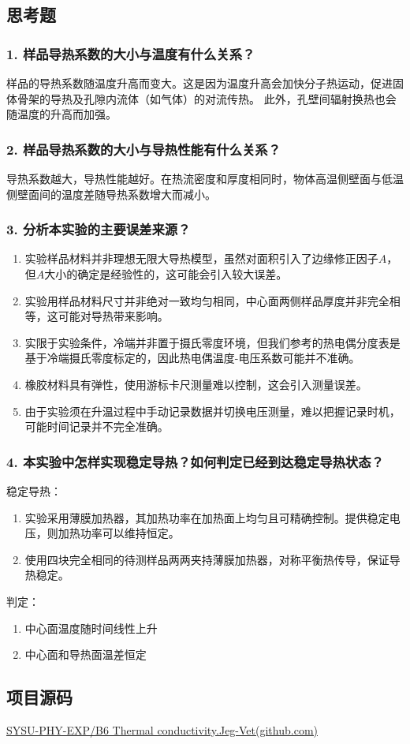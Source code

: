 \documentclass[12pt,a4paper,UTF8]{ctexart}
\begin{document}
\subsection*{思考题}
\subsubsection*{1. 样品导热系数的大小与温度有什么关系？}
样品的导热系数随温度升高而变大。这是因为温度升高会加快分子热运动，促进固体骨架的导热及孔隙内流体（如气体）的对流传热。
此外，孔壁间辐射换热也会随温度的升高而加强。
\subsubsection*{2. 样品导热系数的大小与导热性能有什么关系？}
导热系数越大，导热性能越好。在热流密度和厚度相同时，物体高温侧壁面与低温侧壁面间的温度差随导热系数增大而减小。
\subsubsection*{3. 分析本实验的主要误差来源？}
\begin{enumerate}[label=\arabic*.]
	\item 实验样品材料并非理想无限大导热模型，虽然对面积引入了边缘修正因子$A$，但$A$大小的确定是经验性的，这可能会引入较大误差。
	\item 实验用样品材料尺寸并非绝对一致均匀相同，中心面两侧样品厚度并非完全相等，这可能对导热带来影响。
	\item 实限于实验条件，冷端并非置于摄氏零度环境，但我们参考的热电偶分度表是基于冷端摄氏零度标定的，因此热电偶温度-电压系数可能并不准确。
	\item 橡胶材料具有弹性，使用游标卡尺测量难以控制，这会引入测量误差。
	\item 由于实验须在升温过程中手动记录数据并切换电压测量，难以把握记录时机，可能时间记录并不完全准确。
\end{enumerate}
\subsubsection*{4. 本实验中怎样实现稳定导热？如何判定已经到达稳定导热状态？}
稳定导热：
\begin{enumerate}[label=\arabic*.]
	\item 实验采用薄膜加热器，其加热功率在加热面上均匀且可精确控制。提供稳定电压，则加热功率可以维持恒定。
	\item 使用四块完全相同的待测样品两两夹持薄膜加热器，对称平衡热传导，保证导热稳定。
\end{enumerate}

判定：
\begin{enumerate}[label=\arabic*.]
    \item 中心面温度随时间线性上升
    \item 中心面和导热面温差恒定
\end{enumerate}



\subsection*{项目源码}
\href{https://github.com/Jeg-Vet/SYSU-PHY-EXP/tree/main/B2-Thermal_conductivity}{SYSU-PHY-EXP/B6 Thermal conductivity.Jeg-Vet(github.com)}
\end{document}
